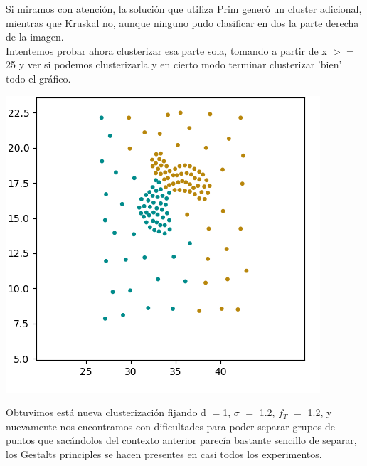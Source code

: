 \documentclass[11pt,a4paper]{article}
\begin{document}
Si  miramos con atención, la solución que utiliza Prim generó un cluster adicional, mientras que Kruskal no, aunque ninguno pudo clasificar en dos la parte derecha de la imagen.\\
Intentemos probar ahora clusterizar esa parte sola, tomando a partir de x $>=$ 25 y ver si podemos clusterizarla y en cierto modo terminar clusterizar 'bien' todo el gráfico.
\begin{center}
\includegraphics[scale=.6]{graficos/zahn_nodos2.png}
\end{center}
Obtuvimos está nueva clusterización fijando d $=$1, $\sigma$ $=$ 1.2, $f_{T}$ $=$ 1.2, y nuevamente nos encontramos con dificultades para poder separar grupos de puntos que sacándolos del contexto anterior parecía bastante sencillo de separar, los Gestalts principles se hacen presentes en casi todos los experimentos.\\
\end{document}
